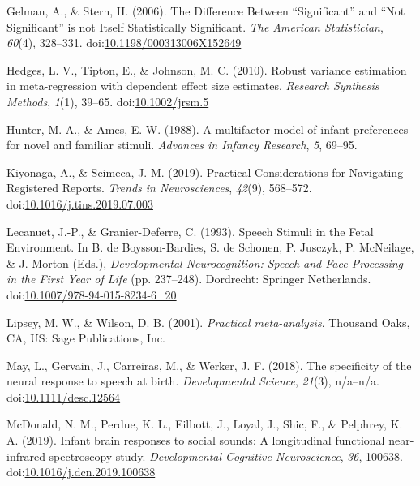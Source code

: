 \documentclass[man]{apa6}
\begin{document}
\hypertarget{ref-gelman_difference_2006}{}
Gelman, A., \& Stern, H. (2006). The Difference Between ``Significant''
and ``Not Significant'' is not Itself Statistically Significant.
\emph{The American Statistician}, \emph{60}(4), 328--331.
doi:\href{https://doi.org/10.1198/000313006X152649}{10.1198/000313006X152649}

\hypertarget{ref-hedges_robust_2010}{}
Hedges, L. V., Tipton, E., \& Johnson, M. C. (2010). Robust variance
estimation in meta-regression with dependent effect size estimates.
\emph{Research Synthesis Methods}, \emph{1}(1), 39--65.
doi:\href{https://doi.org/10.1002/jrsm.5}{10.1002/jrsm.5}

\hypertarget{ref-hunter_multifactor_1988}{}
Hunter, M. A., \& Ames, E. W. (1988). A multifactor model of infant
preferences for novel and familiar stimuli. \emph{Advances in Infancy
Research}, \emph{5}, 69--95.

\hypertarget{ref-kiyonaga_practical_2019}{}
Kiyonaga, A., \& Scimeca, J. M. (2019). Practical Considerations for
Navigating Registered Reports. \emph{Trends in Neurosciences},
\emph{42}(9), 568--572.
doi:\href{https://doi.org/10.1016/j.tins.2019.07.003}{10.1016/j.tins.2019.07.003}

\hypertarget{ref-lecanuet_speech_1993}{}
Lecanuet, J.-P., \& Granier-Deferre, C. (1993). Speech Stimuli in the
Fetal Environment. In B. de Boysson-Bardies, S. de Schonen, P. Jusczyk,
P. McNeilage, \& J. Morton (Eds.), \emph{Developmental Neurocognition:
Speech and Face Processing in the First Year of Life} (pp. 237--248).
Dordrecht: Springer Netherlands.
doi:\href{https://doi.org/10.1007/978-94-015-8234-6_20}{10.1007/978-94-015-8234-6\_20}

\hypertarget{ref-lipsey_practical_2001}{}
Lipsey, M. W., \& Wilson, D. B. (2001). \emph{Practical meta-analysis}.
Thousand Oaks, CA, US: Sage Publications, Inc.

\hypertarget{ref-may_specificity_2018}{}
May, L., Gervain, J., Carreiras, M., \& Werker, J. F. (2018). The
specificity of the neural response to speech at birth.
\emph{Developmental Science}, \emph{21}(3), n/a--n/a.
doi:\href{https://doi.org/10.1111/desc.12564}{10.1111/desc.12564}

\hypertarget{ref-mcdonald_infant_2019}{}
McDonald, N. M., Perdue, K. L., Eilbott, J., Loyal, J., Shic, F., \&
Pelphrey, K. A. (2019). Infant brain responses to social sounds: A
longitudinal functional near-infrared spectroscopy study.
\emph{Developmental Cognitive Neuroscience}, \emph{36}, 100638.
doi:\href{https://doi.org/10.1016/j.dcn.2019.100638}{10.1016/j.dcn.2019.100638}
\end{document}
